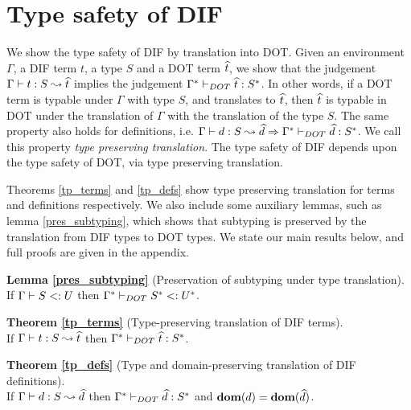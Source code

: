 \section{Type safety of DIF}

We show the type safety of DIF by translation into DOT. Given an environment
$\Gamma$, a DIF term $t$, a type $S$ and a DOT term $\widehat{t}$, we show that the
judgement $\Gamma \vdash t: S \leadsto \widehat{t}$ implies the judgement
$\Gamma^{*} \vdash_{DOT} \widehat{t}: S^{*}$. In other words, if a DOT term is
typable under $\Gamma$ with type $S$, and translates to $\widehat{t}$, then
$\widehat{t}$ is typable in DOT under the translation of $\Gamma$ with the
translation of the type $S$. The same property also holds for definitions, i.e.
$\Gamma \vdash d: S \leadsto \widehat{d} \Rightarrow
\Gamma^{*} \vdash_{DOT} \widehat{d}: S^{*}$. We call this property \emph{type
preserving translation}. The type safety of DIF depends upon the type safety of
DOT, via type preserving translation.

Theorems \ref{tp_terms} and \ref{tp_defs} show type preserving translation for
terms and definitions respectively. We also include some auxiliary lemmas, such
as lemma \ref{pres_subtyping}, which shows that subtyping is preserved by the
translation from DIF types to DOT types. We state our main results below, and
full proofs are given in the appendix.

\vspace{3mm}

\noindent \textbf{Lemma \ref{pres_subtyping}} (Preservation of subtyping under
type translation). \\
If $\Gamma \vdash S <: U$ then $\Gamma^{*} \vdash_{DOT} S^{*} <: U^{*}$.

\vspace{3mm}

\noindent \textbf{Theorem \ref{tp_terms}} (Type-preserving translation of DIF
terms). \\
If $\Gamma \vdash t: S \leadsto \widehat{t}$ then
$\Gamma^{*} \vdash_{DOT} \widehat{t}: S^{*}$.

\vspace{3mm}

\noindent \textbf{Theorem \ref{tp_defs}} (Type and domain-preserving
translation of DIF definitions). \\
If $\Gamma \vdash d: S \leadsto \widehat{d}$ then $\Gamma^{*} \vdash_{DOT} \widehat{d}: S^{*}$
and $\textbf{dom}(d) = \textbf{dom}(\widehat{d})$.

\vspace{3mm}
